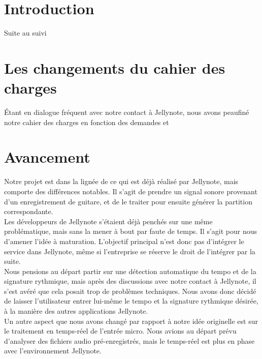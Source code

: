 \documentclass[12pt]{article}
\begin{document}



\newpage
\tableofcontents

\newpage
\clearpage

\section{Introduction}

Suite au suivi 


\newpage
\section{Les changements du cahier des charges}

Étant en dialogue fréquent avec notre contact à Jellynote, nous avons peaufiné notre cahier des charges en fonction des demandes et

\newpage
\section{Avancement}

Notre projet est dans la lignée de ce qui est déjà réalisé par Jellynote, mais comporte des différences notables. Il s’agit de prendre un signal sonore provenant d’un enregistrement de guitare, et de le traiter pour ensuite générer la partition correspondante.\\

Les développeurs de Jellynote s’étaient déjà penchés sur une même problématique, mais sans la mener à bout par faute de temps. Il s’agit pour nous d’amener l’idée à maturation. L’objectif principal n’est donc pas d’intégrer le service dans Jellynote, même si l’entreprise se réserve le droit de l’intégrer par la suite.\\


Nous pensions au départ partir sur une détection automatique du tempo et de la signature rythmique, mais après des discussions avec notre contact à Jellynote, il s'est avéré que cela posait trop de problèmes techniques. Nous avons donc décidé de laisser l'utilisateur entrer lui-même le tempo et la signature rythmique désirée, à la manière des autres applications Jellynote.\\

Un autre aspect que nous avons changé par rapport à notre idée originelle est sur le traitement en temps-réel de l'entrée micro. Nous avions au départ prévu d'analyser des fichiers audio pré-enregistrés, mais le temps-réel est plus en phase avec l'environnement Jellynote.\\
\end{document}
